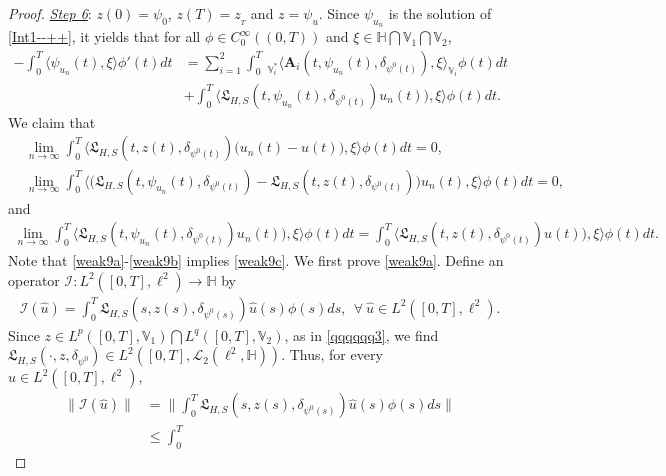 \documentclass[11pt]{article}
\renewcommand{\leq}{\leqslant}
\numberwithin{equation}{section}
\begin{document}
\begin{proof}
\underline{\emph{Step 6}}: $z(0)=\psi_0$, $z(T)=z_{_{T}}$ and $z=\psi_u$.
Since $\psi_{u_n}$ is the solution of \eqref{Int1--++}, it yields that for all
$\phi\in C_0^\infty((0,T))$
and $\xi\in \mathbb{H}\bigcap\mathbb{V}_1
\bigcap\mathbb{V}_2$,
\begin{align}\label{weak9}
-\int_0^T\langle \psi_{u_n}(t) ,\xi\rangle\phi'(t)dt
&=\sum_{i=1}^2
 \int_{0}^T\ _{\mathbb{V}_i^*}\big\langle \mathbf{A}_i(t,\psi_{u_n}(t),
\delta_{\psi^0(t)}),
\xi\big  \rangle_{\mathbb{V}_i}  \phi(t)      dt
\nonumber\\& +\int_{0}^T
 \big\langle \mathfrak{L}_{H,S}(t,\psi_{u_n}(t),
\delta_{\psi^0(t)})u_n(t)),\xi \big\rangle\phi(t) dt.
\end{align}
We claim that
\begin{align}&\label{weak9a}
\lim_{n\rightarrow\infty}\int_{0}^T
 \big\langle \mathfrak{L}_{H,S}(t,z(t),
\delta_{\psi^0(t)})\big(u_n(t)-u(t)\big),\xi \big\rangle \phi(t) dt=0,
\\&
\label{weak9b}
\lim_{n\rightarrow\infty}\int_{0}^T
 \big\langle \big(\mathfrak{L}_{H,S}(t,\psi_{u_n}(t),
\delta_{\psi^0(t)})-\mathfrak{L}_{H,S}(t,z(t),
\delta_{\psi^0(t)})\big)u_n(t),\xi \big\rangle \phi(t) dt=0,
\end{align}
and
\begin{align}\label{weak9c}
\lim_{n\rightarrow\infty}\int_{0}^T
 \big\langle \mathfrak{L}_{H,S}(t,\psi_{u_n}(t),
\delta_{\psi^0(t)})u_n(t)),\xi \big\rangle \phi(t) dt=\int_{0}^T
 \big\langle \mathfrak{L}_{H,S}(t,z(t),
\delta_{\psi^0(t)})u(t)),\xi \big\rangle\phi(t) dt.
\end{align}
Note that \eqref{weak9a}-\eqref{weak9b} implies
\eqref{weak9c}. We first prove \eqref{weak9a}.
Define an operator
$\mathcal{I}:L^2([0,T],\ell^2 )\rightarrow \mathbb{H} $ by
\begin{align}\label{weak9d}
\mathcal{I}(\widehat{u})=\int_{0}^T
  \mathfrak{L}_{H,S}(s,z(s),
\delta_{\psi^0(s)})\widehat{u}(s)\phi(s) ds,\ \
\forall\ \widehat{u}\in L^2([0,T],\ell^2 ).
\end{align}
Since $z\in L^p([0,T], \mathbb{V}_1  ) \bigcap L^q([0,T],
\mathbb{V}_2)$, as in \eqref{qqqqqq3}, we
find  $\mathfrak{L}_{H,S}(\cdot,z,
\delta_{\psi^0})
\in L^2([0,T],\mathcal{L}_2(\ell^2,
\mathbb{H}))$. Thus, for every
$\widehat{u}\in L^2([0,T],\ell^2 )$,
\begin{align}\label{weak9e}
\|\mathcal{I}(\widehat{u})\|&=\bigg\|\int_{0}^T
  \mathfrak{L}_{H,S}(s,z(s),
\delta_{\psi^0(s)})\widehat{u}(s)\phi(s) ds\bigg\|
\nonumber\\&\leq\int_{0}^T

\end{align}
\end{proof}
\end{document}
